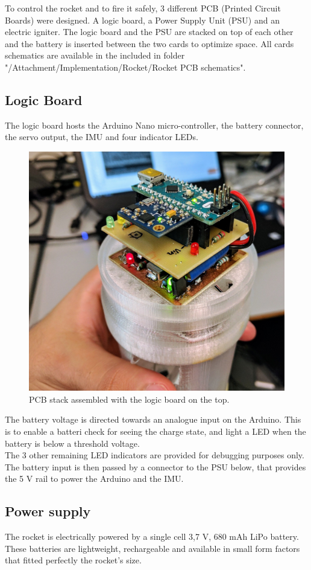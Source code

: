 To control the rocket and to fire it safely, 3 different PCB (Printed Circuit Boards) were designed. A logic board, a Power Supply Unit (PSU) and an electric igniter. The logic board and the PSU are stacked on top of each other and the battery is inserted between the two cards to optimize space. All cards schematics are available in the included  in folder "/Attachment/Implementation/Rocket/Rocket PCB schematics".

\subsection{Logic Board}
The logic board hosts the Arduino Nano micro-controller, the battery connector, the servo output, the IMU and four indicator LEDs.

\begin{figure} [h]
	\centering
	\includegraphics[width=0.7\linewidth]{figures/Rocket/implementation/assembled_PCBs.jpg}
	\caption{PCB stack assembled with the logic board on the top.}
	\label{fig:PCB_stack}
\end{figure}

The battery voltage is directed towards an analogue input on the Arduino. This is to enable a batteri check for seeing the charge state, and light a LED when the battery is below a threshold voltage. \\
The 3 other remaining LED indicators are provided for debugging purposes only.
The battery input is then passed by a connector to the PSU below, that provides the 5 V rail to power the Arduino and the IMU.

\subsection{Power supply}\label{sec:PowerToThePeople}
The rocket is electrically powered by a single cell 3,7 V, 680 mAh LiPo battery. These batteries are lightweight, rechargeable and available in small form factors that fitted perfectly the rocket's size. \\


